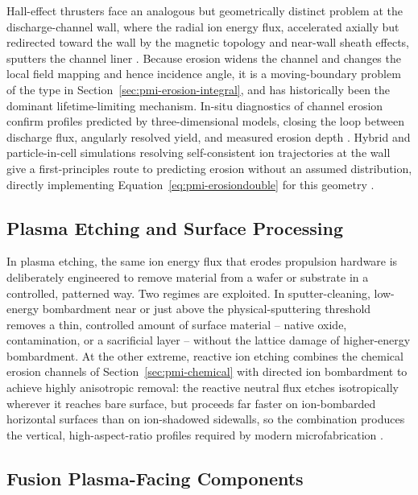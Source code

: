 Hall-effect thrusters face an analogous but geometrically distinct problem at the discharge-channel wall, where the radial ion energy flux, accelerated axially but redirected toward the wall by the magnetic topology and near-wall sheath effects, sputters the channel liner \cite{ref0425}. Because erosion widens the channel and changes the local field mapping and hence incidence angle, it is a moving-boundary problem of the type in Section~\ref{sec:pmi-erosion-integral}, and has historically been the dominant lifetime-limiting mechanism. In-situ diagnostics of channel erosion confirm profiles predicted by three-dimensional models, closing the loop between discharge flux, angularly resolved yield, and measured erosion depth \cite{ref0454}. Hybrid and particle-in-cell simulations resolving self-consistent ion trajectories at the wall give a first-principles route to predicting erosion without an assumed distribution, directly implementing Equation~\eqref{eq:pmi-erosiondouble} for this geometry \cite{ref0433}.

\subsection{Plasma Etching and Surface Processing}

In plasma etching, the same ion energy flux that erodes propulsion hardware is deliberately engineered to remove material from a wafer or substrate in a controlled, patterned way. Two regimes are exploited. In sputter-cleaning, low-energy bombardment near or just above the physical-sputtering threshold removes a thin, controlled amount of surface material -- native oxide, contamination, or a sacrificial layer -- without the lattice damage of higher-energy bombardment. At the other extreme, reactive ion etching combines the chemical erosion channels of Section~\ref{sec:pmi-chemical} with directed ion bombardment to achieve highly anisotropic removal: the reactive neutral flux etches isotropically wherever it reaches bare surface, but proceeds far faster on ion-bombarded horizontal surfaces than on ion-shadowed sidewalls, so the combination produces the vertical, high-aspect-ratio profiles required by modern microfabrication \cite{ref0536}.

\subsection{Fusion Plasma-Facing Components}

